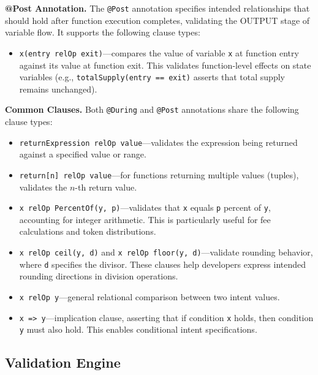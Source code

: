 \documentclass[pdflatex,sn-basic]{sn-jnl}%
\theoremstyle{thmstyleone}%
\theoremstyle{thmstyletwo}%
\theoremstyle{thmstylethree}%
\begin{document}
\smallskip
\noindent\textbf{@Post Annotation.}
The \texttt{@Post} annotation specifies intended relationships that should hold after function execution completes, validating the OUTPUT stage of variable flow.
It supports the following clause types:

\begin{itemize}
    \item \texttt{x(entry relOp exit)}---compares the value of variable \texttt{x} at function entry against its value at function exit. This validates function-level effects on state variables (e.g., \texttt{totalSupply(entry == exit)} asserts that total supply remains unchanged).
\end{itemize}

\smallskip
\noindent\textbf{Common Clauses.}
Both \texttt{@During} and \texttt{@Post} annotations share the following clause types:

\begin{itemize}
    \item \texttt{returnExpression relOp value}---validates the expression being returned against a specified value or range.

    \item \texttt{return[n] relOp value}---for functions returning multiple values (tuples), validates the $n$-th return value.

    \item \texttt{x relOp PercentOf(y, p)}---validates that \texttt{x} equals \texttt{p} percent of \texttt{y}, accounting for integer arithmetic. This is particularly useful for fee calculations and token distributions.

    \item \texttt{x relOp ceil(y, d)} and \texttt{x relOp floor(y, d)}---validate rounding behavior, where \texttt{d} specifies the divisor. These clauses help developers express intended rounding directions in division operations.

    \item \texttt{x relOp y}---general relational comparison between two intent values.

    \item \texttt{x => y}---implication clause, asserting that if condition \texttt{x} holds, then condition \texttt{y} must also hold. This enables conditional intent specifications.
\end{itemize}

\subsection{Validation Engine}
\end{document}
